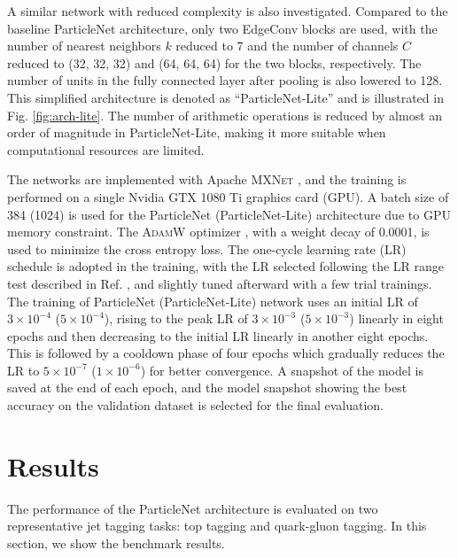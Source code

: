 \documentclass[aps,prd,longbibliography,reprint,amsmath,amssymb,amsfonts]{revtex4-1}
\begin{document}
A similar network with reduced complexity is also investigated. Compared to the baseline ParticleNet architecture, only two EdgeConv blocks are used, with the number of nearest neighbors $k$ reduced to 7 and the number of channels $C$ reduced to (32, 32, 32) and (64, 64, 64) for the two blocks, respectively. The number of units in the fully connected layer after pooling is also lowered to 128. This simplified architecture is denoted as ``ParticleNet-Lite'' and is illustrated in Fig. \ref{fig:arch-lite}. The number of arithmetic operations is reduced by almost an order of magnitude in ParticleNet-Lite, making it more suitable when computational resources are limited.

The networks are implemented with Apache \textsc{MXNet} \cite{DBLP:journals/corr/ChenLLLWWXXZZ15}, and the training is performed on a single Nvidia GTX 1080 Ti graphics card (GPU). A batch size of 384 (1024) is used for the ParticleNet (ParticleNet-Lite) architecture due to GPU memory constraint. The \textsc{AdamW} optimizer \cite{DBLP:journals/corr/abs-1711-05101}, with a weight decay of 0.0001, is used to minimize the cross entropy loss. The one-cycle learning rate (LR) schedule \cite{DBLP:journals/corr/abs-1803-09820} is adopted in the training, with the LR selected following the LR range test described in Ref. \cite{DBLP:journals/corr/abs-1803-09820}, and slightly tuned afterward with a few trial trainings. The training of ParticleNet (ParticleNet-Lite) network uses an initial LR of $3\times10^{-4}$ ($5\times10^{-4}$), rising to the peak LR of $3\times10^{-3}$ ($5\times10^{-3}$) linearly in eight epochs and then decreasing to the initial LR linearly in another eight epochs. This is followed by a cooldown phase of four epochs which gradually reduces the LR to $5\times10^{-7}$ ($1\times10^{-6}$) for better convergence. A snapshot of the model is saved at the end of each epoch, and the model snapshot showing the best accuracy on the validation dataset is selected for the final evaluation.
 \section{Results}
\label{sec:results}

The performance of the ParticleNet architecture is evaluated on two representative jet tagging tasks: top tagging and quark-gluon tagging. In this section, we show the benchmark results.
\end{document}
